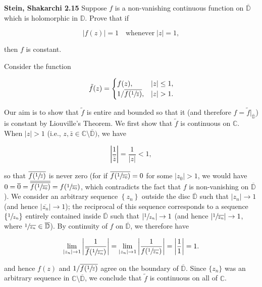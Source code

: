 \newcommand{\closeD}{\overline{\mathbb{D}}}

\textbf{Stein, Shakarchi 2.15}
Suppose $f$ is a non-vanishing continuous function on $\closeD$ which is holomorphic in $\mathbb{D}$. Prove
that if

$$
\left| f(z) \right| = 1 \quad \text{whenever} \; |z| = 1,
$$

then $f$ is constant.

\begin{solution}
    Consider the function

    $$
    \tilde{f}(z) = \begin{cases}
        f(z), &|z| \le 1, \\
        1 / \overline{f(\sfrac{1}{\overline{z}})}, &|z| > 1.
    \end{cases}
    $$

    Our aim is to show that $\tilde{f}$ is entire and bounded so that it (and therefore 
    $f = \tilde{f}\vert_{\closeD}$) is constant by Liouville's Theorem. We first show that $\tilde{f}$ is 
    continuous on $\mathbb{C}$. When $|z| > 1$ (i.e., $z, \bar{z} \in \mathbb{C} \setminus \overline{\mathbb{D}})$, we have

    $$
    \left| \frac{1}{\bar{z}} \right| = \frac{1}{|z|} < 1,
    $$

    so that $\overline{f(\sfrac{1}{\overline{z}})}$ is never zero (for if $\overline{f(\sfrac{1}{\overline{z_0}})} = 0$ 
    for some $|z_0| > 1$, we would have 
    $0 = \overline{0} = \overline{\overline{f(\sfrac{1}{\overline{z_0}})}} = f(\sfrac{1}{\overline{z_0}})$, which
    contradicts the fact that $f$ is non-vanishing on $\closeD$). We consider an arbitrary sequence $\left\{z_n\right\}$ 
    outside the disc $\closeD$ such that $|z_n| \to 1$ (and hence $\left|\overline{z_n}\right| \to 1$); the reciprocal 
    of this sequence corresponds to a sequence $\left\{ \sfrac{1}{z_n} \right\}$ entirely contained inside $\closeD$ 
    such that $\left| \sfrac{1}{z_n} \right| \to 1$ (and hence $\left| \sfrac{1}{\overline{z_n}} \right| \to 1$, where 
    $\sfrac{1}{\overline{z_n}} \in \closeD$). By continuity of $f$ on $\closeD$, we therefore have

    $$
    \lim_{\left| z_n \right| \to 1} \left| \frac{1}{\overline{f}(\sfrac{1}{\overline{z_n}})} \right|
    = \lim_{\left| z_n \right| \to 1} \left| \frac{1}{f(\sfrac{1}{\overline{z_n}})} \right|
    = \left| \frac{1}{1} \right|
    = 1.
    $$

    and hence $f(z)$ and $1 / \overline{f(\sfrac{1}{\overline{z}})}$ agree on the boundary of $\closeD$. Since 
    $\{z_n\}$ was an arbitrary sequence in $\mathbb{C} \setminus \closeD$, we conclude that $\tilde{f}$ is continuous
    on all of $\mathbb{C}$. 
    

\end{solution}

